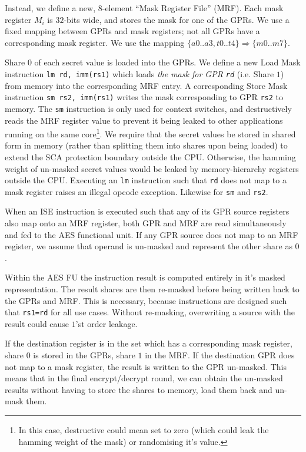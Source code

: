 Instead, we define a new, $8$-element ``Mask Register File'' (MRF).
Each mask register $M_i$ is $32$-bits wide, and stores the mask for
one of the GPRs.
We use a fixed mapping between GPRs and mask registers;
not all GPRs have a corresponding mask register.
We use the mapping $\{a0..a3,t0..t4\} \Rightarrow \{m0..m7\}$.

Share $0$ of each secret value is loaded into the GPRs.
We define a new Load Mask instruction {\tt lm rd, imm(rs1)} which
loads {\em the mask for GPR {\tt rd}}
(i.e. Share $1$)
from memory into the corresponding MRF entry.
A corresponding Store Mask instruction {\tt sm rs2, imm(rs1)} writes
the mask corresponding to GPR {\tt rs2} to memory.
The {\tt sm} instruction is only used for context switches, and
destructively reads the MRF register value to prevent it being
leaked to other applications running on the same core\footnote{
    In this case, destructive could mean set to zero (which could
    leak the hamming weight of the mask) or randomising it's value.}.
We require that the secret values be stored in shared form in memory
(rather than splitting them into shares upon being loaded)
to extend the SCA protection boundary outside the CPU.
Otherwise, the hamming weight of un-masked secret values would be
leaked by memory-hierarchy registers outside the CPU.
Executing an {\tt lm} instruction such that {\tt rd} does not map to
a mask register raises an illegal opcode exception.
Likewise for {\tt sm} and {\tt rs2}.

When an ISE instruction is executed such that any of its GPR source
registers also map onto an MRF register, both GPR and MRF are
read simultaneously and fed to the AES functional unit.
If any GPR source does not map to an MRF register, we assume that
operand is un-masked and represent the other share as $0$.

Within the AES FU the instruction result is computed entirely in it's
masked representation.
The result shares are then re-masked before being written back to the
GPRs and MRF.
This is necessary, because  instructions are designed
such that {\tt rs1=rd} for all use cases.
Without re-masking, overwriting a source with the result could cause 
$1$'st order leakage.

If the destination register is in the set which has a corresponding
mask register, share $0$ is stored in the GPRs, share $1$ in the MRF.
If the destination GPR does not map to a mask register, the result is written
to the GPR un-masked.
This means that in the final encrypt/decrypt round, we can obtain
the un-masked results without having to store the shares to memory,
load them back and un-mask them.

